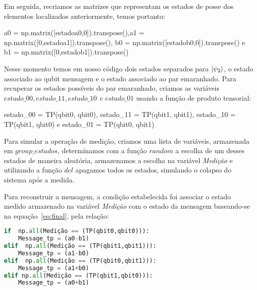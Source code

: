 Em seguida, recriamos as matrizes que representam os estados de posse dos elementos localizados anteriormente, temos portanto:

\begin{center}
\begin{tiny}a0 = np.matrix([estadoa0,0]).transpose(),a1 = np.matrix([0,estadoa1]).transpose(),\linebreak
b0 = np.matrix([estadob0,0]).transpose() e b1 = np.matrix([0,estadob1]).transpose()\end{tiny}
\end{center}

Nesse momento temos em nosso código dois estados separados para $\ket{\psi_2}$, o estado associado ao qubit mensagem e o estado associado ao par emaranhado. Para recuperar os estados possíveis do par emaranhado, criamos as variáveis \textit{$estado\_00, estado\_11, estado\_10$ e $estado\_01$} usando a função de produto tensorial:

\begin{center}
\begin{tiny}estado\_00 = TP(qbit0, qbit0), estado\_11 = TP(qbit1, qbit1),\linebreak
estado\_10 = TP(qbit1, qbit0) e \quad estado\_01 = TP(qbit0, qbit1)\end{tiny}
\end{center}

Para simular a operação de medição, criamos uma lista de variáveis, armazenada em \textit{$group\_estados$}, determinamos com a função \textit{$random$} a escolha de um desses estados de maneira aleatória, armazenamos a escolha na variável \textit{Medição} e utilizando a função \textit{$del$} apagamos todos os estados, simulando o colapso do sistema após a medida.

Para reconstruir a mensagem, a condição estabelecida foi associar o estado medido armazenado na variável \textit{Medição} com o estado da mensagem baseando-se na equação~\eqref{eq:final}, pela relação:
\begin{center}


\begin{lstlisting}[language=Python, caption=Relação de condição para a mensagem em função do estado medido.]
if  np.all(Medição == (TP(qbit0,qbit0))):
    Message_tp = (a0-b1)
elif  np.all(Medição == (TP(qbit1,qbit1))):
    Message_tp = (a1-b0)
elif  np.all(Medição == (TP(qbit0,qbit1))):
    Message_tp = (a1+b0)
elif np.all(Medição == (TP(qbit1,qbit0))):
    Message_tp = (a0+b1)
\end{lstlisting}
\end{center}

